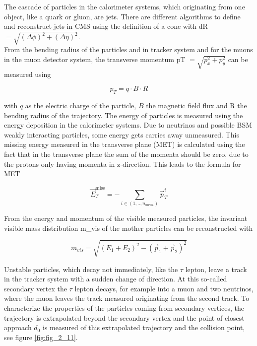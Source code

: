 The cascade of particles in the calorimeter systems, which originating from one object, like a quark or gluon, are jets. There are different algorithms to define and reconstruct jets in \gls{CMS} using the definition of a cone with \gls{dR} $= \sqrt{(\Delta \phi)^{2} + (\Delta \eta)^{2}}$.\\ 

From the bending radius of the particles and in tracker system and for the muons in the muon detector system, the transverse momentum \gls{pT} $= \sqrt{p_{x}^{2} + p_{y}^{2}}$ can be measured using 

\begin{equation}
	\label{eq:eq_2_5}
	p_{T} = q\cdot B \cdot R
\end{equation} 

with $q$ as the electric charge of the particle, $B$ the magnetic field flux and R the bending radius of the trajectory. The energy of particles is measured using the energy deposition in the calorimeter systems. Due to neutrinos and possible \gls{BSM} weakly interacting particles, some energy gets carries away unmeasured. This missing energy measured in the transverse plane (\gls{MET}) is calculated using the fact that in the transverse plane the sum of the momenta should be zero, due to the protons only having momenta in z-direction. This leads to the formula for \gls{MET}

\begin{equation}
	\label{eq:eq_2_6}
	\vec{E}_{T}^{\text{miss}} = - \sum_{i \in (1, .., n_{\text{meas.}})} \vec{p}_{T}^{i} 
\end{equation}

From the energy and momentum of the visible measured particles, the invariant visible mass distribution \gls{m_vis} of the mother particles can be reconstructed with 

\begin{equation}
	\label{eq:eq_2_6}
	m_{vis} = \sqrt{(E_{1} + E_{2})^2 - (\vec{p}_{1} + \vec{p}_{2})^2}
\end{equation}


Unstable particles, which decay not immediately, like the $\tau$ lepton, leave a track in the tracker system with a sudden change of direction. At this so-called secondary vertex the $\tau$ lepton decays, for example into a muon and two neutrinos, where the muon leaves the track measured originating from the second track. To characterize the properties of the particles coming from secondary vertices, the trajectory is extrapolated beyond the secondary vertex and the point of closest approach $d_{0}$ is measured of this extrapolated trajectory and the collision point, see figure \ref{fig:fig_2_11}.

